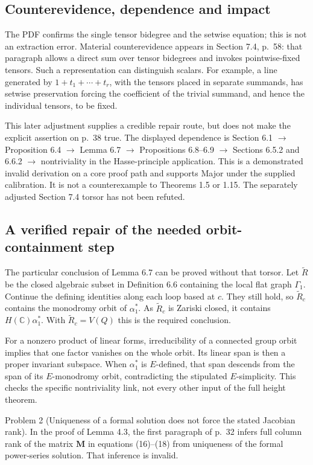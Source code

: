 \documentclass[10pt]{article}
\begin{document}
\subsection*{Counterevidence, dependence and impact}
The PDF confirms the single tensor bidegree and the setwise equation; this is not an extraction error. Material counterevidence appears in Section 7.4, p. 58: that paragraph allows a direct sum over tensor bidegrees and invokes pointwise-fixed tensors. Such a representation can distinguish scalars. For example, a line generated by \(1+t_1+\cdots+t_r\), with the tensors placed in separate summands, has setwise preservation forcing the coefficient of the trivial summand, and hence the individual tensors, to be fixed.\par
This later adjustment supplies a credible repair route, but does not make the explicit assertion on p. 38 true. The displayed dependence is Section 6.1 \(\longrightarrow\) Proposition 6.4 \(\longrightarrow\) Lemma 6.7 \(\longrightarrow\) Propositions 6.8–6.9 \(\longrightarrow\) Sections 6.5.2 and 6.6.2 \(\longrightarrow\) nontriviality in the Hasse-principle application. This is a demonstrated invalid derivation on a core proof path and supports Major under the supplied calibration. It is not a counterexample to Theorems 1.5 or 1.15. The separately adjusted Section 7.4 torsor has not been refuted.\par
\subsection*{A verified repair of the needed orbit-containment step}
The particular conclusion of Lemma 6.7 can be proved without that torsor. Let \(\widetilde R\) be the closed algebraic subset in Definition 6.6 containing the local flat graph \(\Gamma_1\). Continue the defining identities along each loop based at \(c\). They still hold, so \(\widetilde R_c\) contains the monodromy orbit of \(\alpha_1^*\). As \(\widetilde R_c\) is Zariski closed, it contains \(H(\mathbb C)\alpha_1^*\). With \(\widetilde R_c=V(Q)\) this is the required conclusion.\par
For a nonzero product of linear forms, irreducibility of a connected group orbit implies that one factor vanishes on the whole orbit. Its linear span is then a proper invariant subspace. When \(\alpha_1^*\) is \(E\)-defined, that span descends from the span of its \(E\)-monodromy orbit, contradicting the stipulated \(E\)-simplicity. This checks the specific nontriviality link, not every other input of the full height theorem.\par
Problem 2 (Uniqueness of a formal solution does not force the stated Jacobian rank).  In the proof of Lemma 4.3, the first paragraph of p. 32 infers full column rank of the matrix \(\boldsymbol M\) in equations (16)–(18) from uniqueness of the formal power-series solution. That inference is invalid.\par
\end{document}

